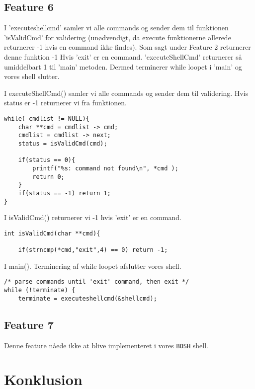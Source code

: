 \documentclass[danish]{report}
\begin{document}
\section{Feature 6}


I 'executeshellcmd' samler vi alle commands og sender dem til funktionen 'isValidCmd' for validering (unødvendigt, da execute funktionerne allerede returnerer -1 hvis en command ikke findes). Som sagt under Feature 2 returnerer denne funktion -1 Hvis 'exit' er en command. 'executeShellCmd' returnerer så umiddelbart 1 til 'main' metoden. Dermed terminerer while loopet i 'main' og vores shell slutter. 

I executeShellCmd() samler vi alle commands og sender dem til validering. Hvis status er -1 returnerer vi fra funktionen.

\begin{lstlisting}
while( cmdlist != NULL){
	char **cmd = cmdlist -> cmd;
	cmdlist = cmdlist -> next;
	status = isValidCmd(cmd);

	if(status == 0){ 
		printf("%s: command not found\n", *cmd );
		return 0;
	}
	if(status == -1) return 1;
}
\end{lstlisting}

I isValidCmd() returnerer vi -1 hvis 'exit' er en command.
\begin{lstlisting}
int isValidCmd(char **cmd){
	
	if(strncmp(*cmd,"exit",4) == 0) return -1;
\end{lstlisting}

I main(). Terminering af while loopet afslutter vores shell. 
\begin{lstlisting}
/* parse commands until 'exit' command, then exit */
while (!terminate) {
	terminate = executeshellcmd(&shellcmd);
\end{lstlisting}

\section{Feature 7}

Denne feature nåede ikke at blive implementeret i vores {\tt BOSH} shell.

\chapter{Konklusion}
\end{document}
